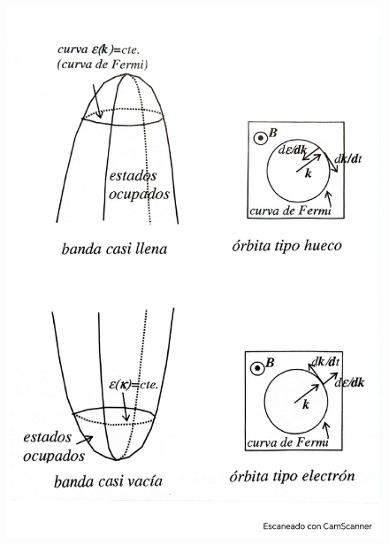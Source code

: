 \begin{figure}[h!] \centering
	\includegraphics[scale=0.5]{Cuerpo/Ch_08/Fotos libro 4.pdf}
	\caption{}
	\label{Fig:08-04}
\end{figure}